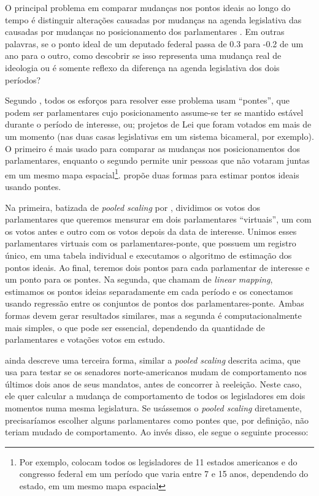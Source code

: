 \documentclass[a4paper,titlepage]{ppgi}\usepackage[]{graphicx}\usepackage[]{color}
\begin{document}
O principal problema em comparar mudanças nos pontos ideais ao longo do tempo é
distinguir alterações causadas por mudanças na agenda legislativa das causadas
por mudanças no posicionamento dos parlamentares \cite{Bailey2007}. Em outras
palavras, se o ponto ideal de um deputado federal passa de 0.3 para -0.2 de um ano
para o outro, como descobrir se isso representa uma mudança real de ideologia ou
é somente reflexo da diferença na agenda legislativa dos dois períodos?

Segundo , todos os esforços para resolver esse problema
usam ``pontes'', que podem ser parlamentares cujo posicionamento assume-se ter
se mantido estável durante o período de interesse, ou; projetos de Lei que
foram votados em mais de um momento (nas duas casas legislativas em um sistema
bicameral, por exemplo). O primeiro é mais usado para comparar as mudanças nos
posicionamentos dos parlamentares, enquanto o segundo permite unir pessoas que
não votaram juntas em um mesmo mapa espacial\footnote{Por exemplo,
 colocam todos os legisladores de 11 estados americanos e
do congresso federal em um período que varia entre 7 e 15 anos, dependendo do
estado, em um mesmo mapa espacial}.  propõe duas formas
para estimar pontos ideais usando pontes.

Na primeira, batizada de \emph{pooled scaling} por ,
dividimos os votos dos parlamentares que queremos mensurar em dois
parlamentares ``virtuais'', um com os votos antes e outro com os votos depois
da data de interesse. Unimos esses parlamentares virtuais com os
parlamentares-ponte, que possuem um registro único, em uma tabela individual e
executamos o algoritmo de estimação dos pontos ideais. Ao final, teremos dois
pontos para cada parlamentar de interesse e um ponto para os pontes. Na
segunda, que  chamam de \emph{linear mapping}, estimamos
os pontos ideias separadamente em cada período e os conectamos usando regressão
entre os conjuntos de pontos dos parlamentares-ponte. Ambas formas devem gerar
resultados similares, mas a segunda é computacionalmente mais simples, o que
pode ser essencial, dependendo da quantidade de parlamentares e votações votos
em estudo.

 ainda descreve uma terceira forma, similar a
\emph{pooled scaling} descrita acima, que usa para testar se os senadores
norte-americanos mudam de comportamento nos últimos dois anos de seus mandatos,
antes de concorrer à reeleição. Neste caso, ele quer calcular a mudança de
comportamento de todos os legisladores em dois momentos numa mesma legislatura.
Se usássemos o \emph{pooled scaling} diretamente, precisaríamos escolher alguns
parlamentares como pontes que, por definição, não teriam mudado de
comportamento. Ao invés disso, ele segue o seguinte processo:
\end{document}
